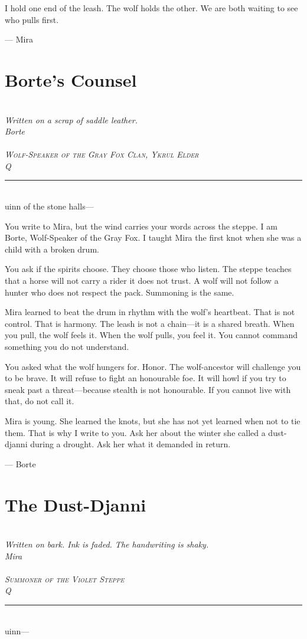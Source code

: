 \documentclass[11pt,twoside]{book}
\newcommand{\sealdecor}{%
  \begin{center}\textcolor{sealcolor}{\faStamp}\end{center}}
\newcommand{\letter}[4]{%
  \begin{center}
    \itshape
    \textcolor{sealcolor}{\faEnvelope}\\[0.2cm]
    \small #1\\[0.1cm]
    \small #2\\[0.1cm]
    \textcolor{sealcolor}{\faStamp}\\[0.3cm]
    \scshape #3\\[0.1cm]
    \itshape #4\\[0.5cm]
  \end{center}
  \noindent\rule{\textwidth}{0.3pt}\\[0.3cm]
}
\begin{document}
I hold one end of the leash. The wolf holds the other. We are both waiting to see who pulls first.

\vspace{0.5em}
\noindent\hfill --- Mira

\sealdecor

\chapter{Borte's Counsel}
\letter
  {Written on a scrap of saddle leather.}
  {Borte}{Wolf-Speaker of the Gray Fox Clan, Ykrul Elder}

Quinn of the stone halls---

You write to Mira, but the wind carries your words across the steppe. I am Borte, Wolf-Speaker of the Gray Fox. I taught Mira the first knot when she was a child with a broken drum.

You ask if the spirits choose. They choose those who listen. The steppe teaches that a horse will not carry a rider it does not trust. A wolf will not follow a hunter who does not respect the pack. Summoning is the same.

Mira learned to beat the drum in rhythm with the wolf's heartbeat. That is not control. That is harmony. The leash is not a chain---it is a shared breath. When you pull, the wolf feels it. When the wolf pulls, you feel it. You cannot command something you do not understand.

You asked what the wolf hungers for. Honor. The wolf-ancestor will challenge you to be brave. It will refuse to fight an honourable foe. It will howl if you try to sneak past a threat---because stealth is not honourable. If you cannot live with that, do not call it.

Mira is young. She learned the knots, but she has not yet learned when not to tie them. That is why I write to you. Ask her about the winter she called a dust-djanni during a drought. Ask her what it demanded in return.

\vspace{0.5em}
\noindent\hfill --- Borte

\sealdecor

\chapter{The Dust-Djanni}
\letter
  {Written on bark. Ink is faded. The handwriting is shaky.}
  {Mira}{Summoner of the Violet Steppe}

Quinn---
\end{document}
